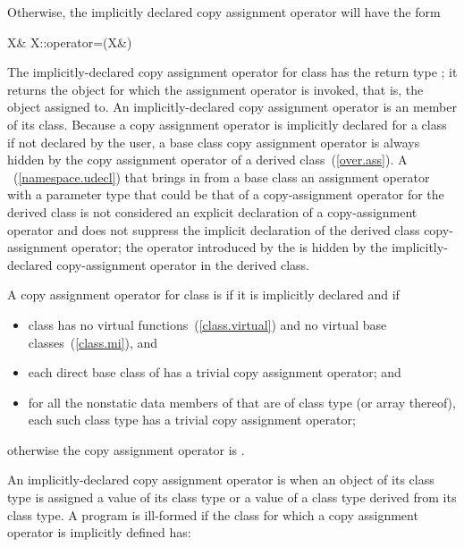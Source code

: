 Otherwise, the implicitly declared copy
assignment operator
will have the form

\begin{codeblock}
X& X::operator=(X&)
\end{codeblock}

The implicitly-declared copy assignment operator for class
has the return type
;
it returns the object for which the assignment operator is invoked, that is,
the object assigned to.
An implicitly-declared copy assignment operator is an
member of its class.
%
Because a copy assignment operator is implicitly declared for a class
if not declared by the user,
a base class copy assignment operator is always hidden
by the copy assignment operator of a derived class~(\ref{over.ass}).
A
~(\ref{namespace.udecl}) that brings in from a base class an assignment operator
with a parameter type that could be that of a
copy-assignment operator for the
derived class is not considered an explicit declaration of a copy-assignment
operator and does not suppress the implicit declaration of the derived class
copy-assignment operator;
the operator introduced by the
is hidden by the implicitly-declared copy-assignment operator in the derived
class.

\pnum
{}%
A copy assignment operator for class
is
if it is implicitly declared and if

\begin{itemize}
\item
class
has no virtual functions~(\ref{class.virtual})
and no virtual base classes~(\ref{class.mi}), and

\item
each direct base class of  has a trivial copy assignment operator; and

\item
for all the nonstatic data members of
that are of class type (or array thereof),
each such class type has a trivial copy assignment operator;
\end{itemize}

otherwise the copy assignment operator is
.

\pnum
{}%
An implicitly-declared copy assignment operator
is
when an object of its class type is
assigned a value of its class type or a value of a class type derived
from its class type. A program is ill-formed
if the class for which a copy assignment operator is implicitly defined has:

